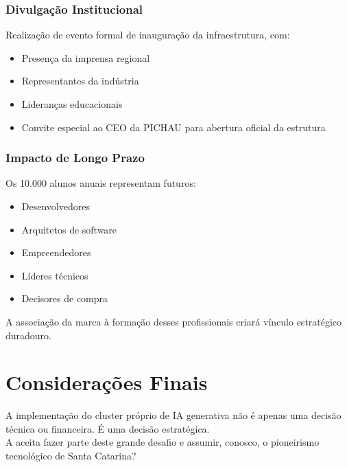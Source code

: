 \documentclass[12pt,a4paper,]{abntex2}
\begin{document}
\subsection{Divulgação Institucional}
Realização de evento formal de inauguração da infraestrutura, com:
\begin{itemize}
\item Presença da imprensa regional
\item Representantes da indústria
\item Lideranças educacionais
\item Convite especial ao CEO da PICHAU para abertura oficial da estrutura
\end{itemize}

\subsection{Impacto de Longo Prazo}
Os 10.000 alunos anuais representam futuros:
\begin{itemize}
\item Desenvolvedores
\item Arquitetos de software
\item Empreendedores
\item Líderes técnicos
\item Decisores de compra
\end{itemize}

A associação da marca à formação desses profissionais criará vínculo estratégico duradouro.

\chapter{Considerações Finais}
A implementação do cluster próprio de IA generativa não é apenas uma decisão técnica ou financeira. É uma decisão estratégica.
\\A \empresaParceiraAbr aceita fazer parte deste grande desafio e assumir, conosco, o pioneirismo tecnológico de Santa Catarina?
\end{document}
